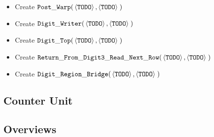 \begin{itemize}
        \item Create
        $\begin{aligned}[t]
            {\tt Post\_Warp}(&\left\langle {\tt TODO} \right\rangle,
                       \left\langle {\tt TODO} \right\rangle \;)
        \end{aligned}$

        \item Create
        $\begin{aligned}[t]
            {\tt Digit\_Writer}(&\left\langle {\tt TODO} \right\rangle,
                      \left\langle {\tt TODO} \right\rangle \;)
        \end{aligned}$

        \item Create
        $\begin{aligned}[t]
            {\tt Digit\_Top}(&\left\langle {\tt TODO} \right\rangle,
                   \left\langle {\tt TODO} \right\rangle \;)
        \end{aligned}$

        \item Create
        $\begin{aligned}[t]
            {\tt Return\_From\_Digit3\_Read\_Next\_Row}(&\left\langle {\tt TODO} \right\rangle,
                                          \left\langle {\tt TODO} \right\rangle \;)
        \end{aligned}$

        \item Create
        $\begin{aligned}[t]
            {\tt Digit\_Region\_Bridge}(&\left\langle {\tt TODO} \right\rangle,
                                         \left\langle {\tt TODO} \right\rangle \;)
        \end{aligned}$
    \end{itemize}


\subsection{ Counter Unit }

    
    
    
    
    
    

\subsection{Overviews}

